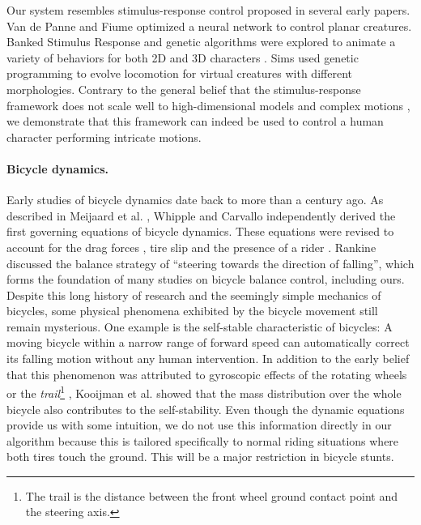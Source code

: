 Our system resembles stimulus-response control proposed in several early papers. Van de Panne and Fiume \cite{vandePanne:1993} optimized a neural network to control planar creatures.
Banked Stimulus Response and genetic algorithms were explored to animate a variety of behaviors for both 2D \cite{Ngo:1993} and 3D characters \cite{Auslander:1995}. Sims \cite{Sims:1994} used genetic programming to evolve locomotion for virtual creatures with different morphologies. Contrary to the general belief that the stimulus-response framework does not scale well to high-dimensional models and complex motions \cite{Geijtenbeek2012a}, we demonstrate that this framework can indeed be used to control a human character performing intricate motions.

\paragraph{Bicycle dynamics.} Early studies of bicycle dynamics date back to more than a century ago. As described in Meijaard et al. \cite{Meijaard2007}, Whipple \cite{Whipple1899} and Carvallo \cite{Carvallo1900} independently derived the first governing equations of bicycle dynamics. These equations were revised to account for the drag forces \cite{Collins1963}, tire slip \cite{Singh1964} and the presence of a rider \cite{van1975method}. Rankine \cite{Rankine1870} discussed the balance strategy of ``steering towards the direction of falling'', which forms the foundation of many studies on bicycle balance control, including ours. Despite this long history of research and the seemingly simple mechanics of bicycles, some physical phenomena exhibited by the bicycle movement still remain mysterious. One example is the self-stable characteristic of bicycles: A moving bicycle within a narrow range of forward speed can automatically correct its falling motion without any human intervention. In addition to the early belief that this phenomenon was attributed to gyroscopic effects of the rotating wheels \cite{Klein1910} or the \emph{trail}\footnote{The trail is the distance between the front wheel ground contact point and the steering axis.} \cite{Jones1970}, Kooijman et al. \cite{Kooijman2011} showed that the mass distribution over the whole bicycle also contributes to the self-stability. Even though the dynamic equations provide us with some intuition, we do not use this information directly in our algorithm because this is tailored specifically to normal riding situations where both tires touch the ground. This will be a major restriction in bicycle stunts.

